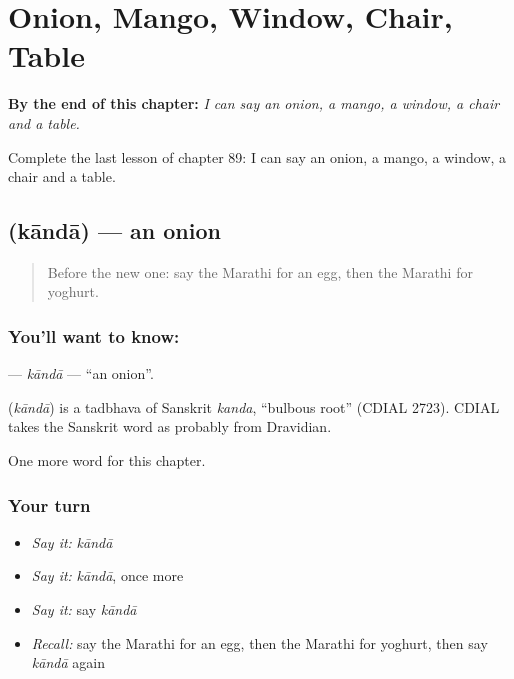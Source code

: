 
\chapter{Onion, Mango, Window, Chair, Table}
\label{ch:mr-onion-mango-window-chair-table}

\begin{chapteropening}
\textbf{By the end of this chapter:} \emph{I can say an onion, a mango, a window, a chair and a table.}

Complete the last lesson of chapter 89: I can say an onion, a mango, a window, a chair and a table.
\end{chapteropening}

\section[\texorpdfstring{\mr{कांदा} (kāndā)}{कांदा (kāndā)}]{ (kāndā) — an onion}

\label{lesson:MR-C89-kanda}



\begin{quote}
Before the new one: say the Marathi for an egg, then the Marathi for yoghurt.
\end{quote}

\subsection*{You'll want to know: }
\textbf{} — \emph{kāndā} — \textquotedblleft{}an onion\textquotedblright{}.

\begin{cousinweb}
\textbf{} (\emph{kāndā}) is a tadbhava of Sanskrit \emph{kanda}, \textquotedblleft{}bulbous root\textquotedblright{} (CDIAL 2723). CDIAL takes the Sanskrit word as probably from Dravidian.
\end{cousinweb}

\begin{grammarlens}[title={What you've built}]
One more word for this chapter.
\end{grammarlens}

\subsection*{Your turn}
\begin{itemize}
\raggedright
  \item \emph{Say it:} \emph{kāndā}
  \item \emph{Say it:} \emph{kāndā}, once more
  \item \emph{Say it:} say \emph{kāndā}
  \item \emph{Recall:} say the Marathi for an egg, then the Marathi for yoghurt, then say \emph{kāndā} again
\end{itemize}

